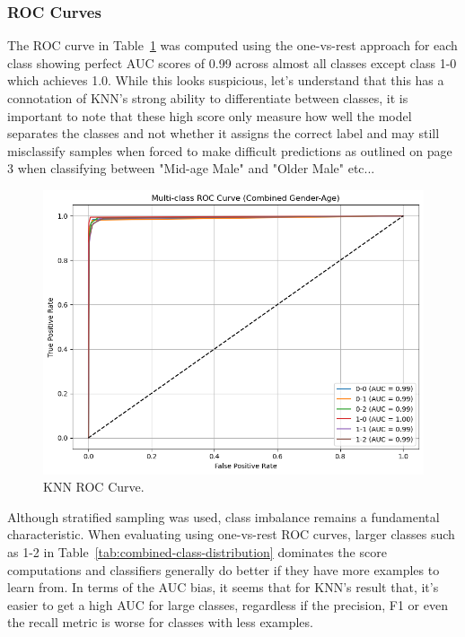 \documentclass[10pt,twocolumn]{article}
\begin{document}
\subsubsection{ROC Curves}
The ROC curve in Table~\ref{fig:knn-roc} was computed using the one-vs-rest approach for each class showing perfect AUC scores of 0.99 across almost all classes except class 1-0 which achieves 1.0. While this looks suspicious, let's understand that this has a connotation of KNN's strong ability to differentiate between classes, it is important to note that these high score only measure how well the model separates the classes and not whether it assigns the correct label and may still misclassify samples when forced to make difficult predictions as outlined on page 3 when classifying between "Mid-age Male" and "Older Male" etc...
\begin{figure}[H]
    \centering
    \includegraphics[width=0.85\linewidth]{images/knn/roc curve.png}
    \caption{KNN ROC Curve.}
    \label{fig:knn-roc}
\end{figure}

Although stratified sampling was used, class imbalance remains a fundamental characteristic. When evaluating using one-vs-rest ROC curves, larger classes such as 1-2 in Table~\ref{tab:combined-class-distribution} dominates the score computations and classifiers generally do better if they have more examples to learn from. In terms of the AUC bias, it seems that for KNN's result that, it's easier to get a high AUC for large classes, regardless if the precision, F1 or even the recall metric is worse for classes with less examples.
\end{document}

